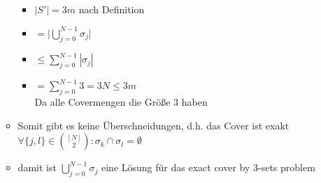 \documentclass[12pt,a4paper]{article}
\begin{document}
\begin{itemize}
\begin{itemize}
\begin{itemize}
\item $|S'| = 3m$ nach Definition
\item $\displaystyle = \big\vert \bigcup_{j=0}^{N-1} \sigma_j \big\vert$
\item $\displaystyle \leq \sum_{j=0}^{N-1} |\sigma_j |$
\item $\displaystyle = \sum_{j=0}^{N-1} 3 = 3N \leq 3m$\\
Da alle Covermengen die Größe 3 haben
\end{itemize}
\item Somit gibt es keine Überschneidungen, d.h. das Cover ist exakt\\
$\forall\{j,l\}\in\binom{[N]}{2}: \sigma_k\cap\sigma_l = \emptyset$
\item damit ist $\displaystyle \bigcup_{j=0}^{N-1} \sigma_j$ eine Lösung für das exact cover by 3-sets problem
\end{itemize}
\end{itemize}
\end{document}
